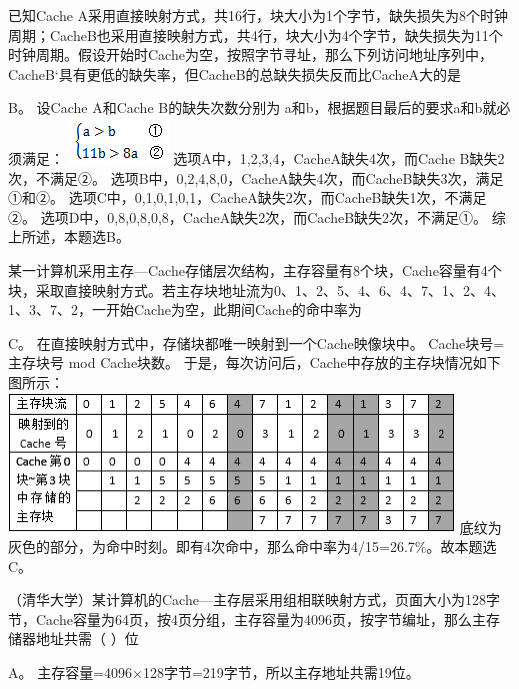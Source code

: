 \question 已知Cache
A采用直接映射方式，共16行，块大小为1个字节，缺失损失为8个时钟周期；CacheB也采用直接映射方式，共4行，块大小为4个字节，缺失损失为11个时钟周期。假设开始时Cache为空，按照字节寻址，那么下列访问地址序列中，CacheB`具有更低的缺失率，但CacheB的总缺失损失反而比CacheA大的是
\par{}
\begin{solution}B。 设Cache A和Cache B的缺失次数分别为
a和b，根据题目最后的要求a和b就必须满足：
\includegraphics[width=1.04167in,height=0.47917in]{computerassets/f5fe4befaad7c28dbc80b0c430cfe843.jpeg}
选项A中，1,2,3,4，CacheA缺失4次，而Cache B缺失2次，不满足②。
选项B中，0,2,4,8,0，CacheA缺失4次，而CacheB缺失3次，满足①和②。
选项C中，0,1,0,1,0,1，CacheA缺失2次，而CacheB缺失1次，不满足②。
选项D中，0,8,0,8,0,8，CacheA缺失2次，而CacheB缺失2次，不满足①。
综上所述，本题选B。
\end{solution}
\question 某一计算机采用主存---Cache存储层次结构，主存容量有8个块，Cache容量有4个块，采取直接映射方式。若主存块地址流为0、1、2、5、4、6、4、7、1、2、4、1、3、7、2，一开始Cache为空，此期间Cache的命中率为
\par{}
\begin{solution}C。 在直接映射方式中，存储块都唯一映射到一个Cache映像块中。
Cache块号=主存块号 mod Cache块数。
于是，每次访问后，Cache中存放的主存块情况如下图所示：
\includegraphics[width=4.65625in,height=1.45833in]{computerassets/9555ff92dfec9b27551485a6ff8fd8cd.jpeg}
底纹为灰色的部分，为命中时刻。即有4次命中，那么命中率为4/15=26.7\%。故本题选C。
\end{solution}
\question （清华大学）某计算机的Cache---主存层采用组相联映射方式，页面大小为128字节，Cache容量为64页，按4页分组，主存容量为4096页，按字节编址，那么主存储器地址共需（
）位
\par{}
\begin{solution}A。 主存容量=4096×128字节=219字节，所以主存地址共需19位。
\end{solution}
